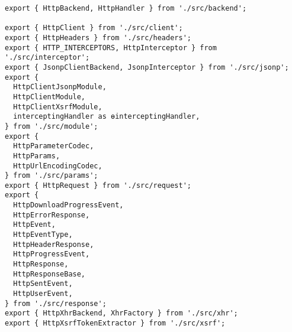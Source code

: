 \begin{verbatim}
export { HttpBackend, HttpHandler } from './src/backend';

export { HttpClient } from './src/client';
export { HttpHeaders } from './src/headers';
export { HTTP_INTERCEPTORS, HttpInterceptor } from './src/interceptor';
export { JsonpClientBackend, JsonpInterceptor } from './src/jsonp';
export {
  HttpClientJsonpModule,
  HttpClientModule,
  HttpClientXsrfModule,
  interceptingHandler as ɵinterceptingHandler,
} from './src/module';
export {
  HttpParameterCodec,
  HttpParams,
  HttpUrlEncodingCodec,
} from './src/params';
export { HttpRequest } from './src/request';
export {
  HttpDownloadProgressEvent,
  HttpErrorResponse,
  HttpEvent,
  HttpEventType,
  HttpHeaderResponse,
  HttpProgressEvent,
  HttpResponse,
  HttpResponseBase,
  HttpSentEvent,
  HttpUserEvent,
} from './src/response';
export { HttpXhrBackend, XhrFactory } from './src/xhr';
export { HttpXsrfTokenExtractor } from './src/xsrf';
\end{verbatim}
